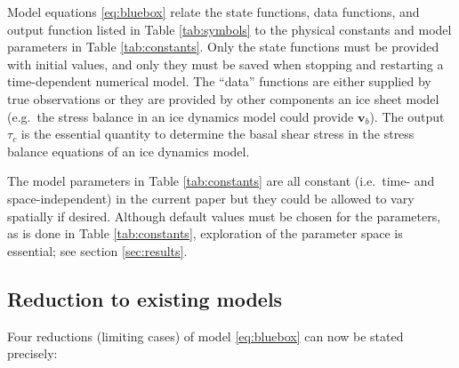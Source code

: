 \documentclass[11pt,final]{amsart}
\newcommand\bv{\mathbf{v}}
\begin{document}
Model equations \eqref{eq:bluebox} relate the state functions, data functions, and output function listed in Table \ref{tab:symbols} to the physical constants and model parameters in Table \ref{tab:constants}.  Only the state functions must be provided with initial values, and only they must be saved when stopping and restarting a time-dependent numerical model.  The ``data'' functions are either supplied by true observations or they are provided by other components an ice sheet model (e.g.~the stress balance in an ice dynamics model could provide $\bv_b$).  The output $\tau_c$ is the essential quantity to determine the basal shear stress in the stress balance equations of an ice dynamics model.

The model parameters in Table \ref{tab:constants} are all constant (i.e.~time- and space-independent) in the current paper but they could be allowed to vary spatially if desired.  Although default values must be chosen for the parameters, as is done in Table \ref{tab:constants}, exploration of the parameter space is essential; see section \ref{sec:results}.

\subsection*{Reduction to existing models}  Four reductions (limiting cases) of model \eqref{eq:bluebox} can now be stated precisely:
\end{document}
